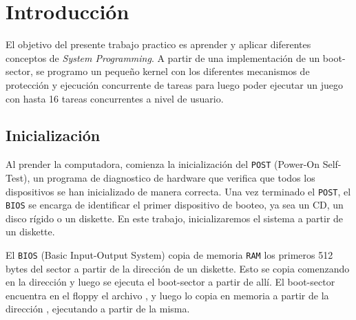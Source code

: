 \section{Introducción}

El objetivo del presente trabajo practico es aprender y aplicar diferentes conceptos de \textit{System Programming}. A partir de una implementación de un boot-sector, se programo un pequeño kernel con los diferentes mecanismos de protección y ejecución concurrente de tareas para luego poder ejecutar un juego con hasta 16 tareas concurrentes a nivel de usuario.

\subsection{Inicialización}

Al prender la computadora, comienza la inicialización del \texttt{POST} (Power-On Self-Test), un programa de diagnostico de hardware que verifica que todos los dispositivos se han inicializado de manera correcta. Una vez terminado el \texttt{POST}, el \texttt{BIOS} se encarga de identificar el primer dispositivo de booteo, ya sea un CD, un disco rígido o un diskette. En este trabajo, inicializaremos el sistema a partir de un diskette.

El \texttt{BIOS} (Basic Input-Output System) copia de memoria \texttt{RAM} los primeros 512 bytes del sector a partir de la dirección  de un diskette. Esto se copia comenzando en la dirección  y luego se ejecuta el boot-sector a partir de allí. El boot-sector encuentra en el floppy el archivo , y luego lo copia en memoria a partir de la dirección , ejecutando a partir de la misma.

